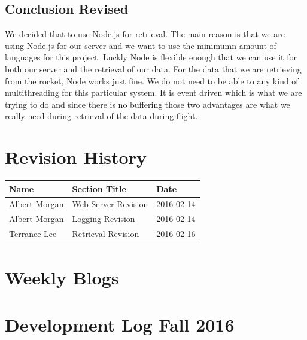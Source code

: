 \documentclass[10pt,draftclsnofoot,onecolumn]{IEEEtran}
\begin{document}
	\subsection{Conclusion Revised}
	We decided that to use Node.js for retrieval.  The main reason is that we are using Node.js for our server and we want to use
	the minimumn amount of languages for this project.  Luckly Node is flexible enough that we can use it for both our server and
	the retrieval of our data.  For the data that we are retrieving from the rocket, Node works just fine.  We do not need to be 
	able to any kind of multithreading for this particular system. It is event driven which is what we are trying to do and since
	there is no buffering those two advantages are what we really need during retrieval of the data during flight.
	
	
	\section*{Revision History}

	\begin{tabular}{l | l | l}
	Name & Section Title & Date\\ \hline
	Albert Morgan & Web Server Revision & 2016-02-14\\
	Albert Morgan & Logging Revision & 2016-02-14\\
	Terrance Lee & Retrieval Revision & 2016-02-16\\
	\end{tabular}




























\section{Weekly Blogs}


\section{Development Log Fall 2016}
\end{document}
